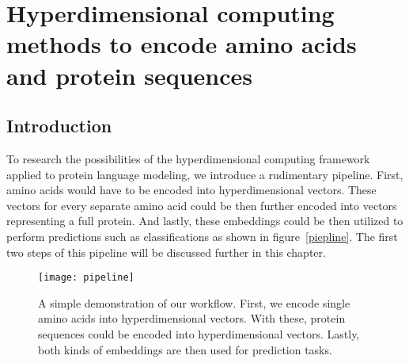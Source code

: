 \chapter[Amino acid and protein encoding]{Hyperdimensional computing methods to encode amino acids and protein sequences}
\section{Introduction}
To research the possibilities of the hyperdimensional computing framework applied to protein language modeling, we introduce a rudimentary pipeline. First, amino acids would have to be encoded into hyperdimensional vectors. These vectors for every separate amino acid could be then further encoded into vectors representing a full protein. And lastly, these embeddings could be then utilized to perform predictions such as classifications as shown in figure~\ref{piepline}. The first two steps of this pipeline will be discussed further in this chapter.

\begin{figure}[H]
    \centering
    \texttt{[image: pipeline]}
    \caption{A simple demonstration of our workflow. First, we encode single amino acids into hyperdimensional vectors. With these, protein sequences could be encoded into hyperdimensional vectors. Lastly, both kinds of embeddings are then used for prediction tasks.}
    \label{fig:pipeline}
\end{figure}

